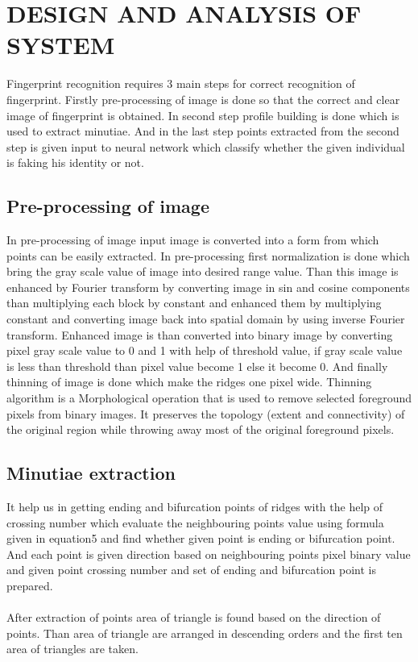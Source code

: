 \documentclass[a4paper, 12pt]{article}
\begin{document}
\section{DESIGN AND ANALYSIS OF SYSTEM}
Fingerprint recognition requires 3 main steps for correct recognition of fingerprint. Firstly pre-processing of image is done so that the correct and clear image of fingerprint is obtained. In second step profile building is done which is used to extract minutiae. And in the last step points extracted from the second step is given input to neural network which classify whether the given individual is faking his identity or not.
\subsection{Pre-processing of image}
In pre-processing of image input image is converted into a form from which points can be easily extracted. In pre-processing first normalization is done which bring the gray scale value of image into desired range value. Than this image is enhanced by Fourier transform by converting image in sin and cosine components than multiplying each block by constant and enhanced them by multiplying constant and converting image back into spatial domain by using inverse Fourier transform. Enhanced image is than converted into binary image by converting pixel gray scale value to 0 and 1 with help of threshold value, if gray scale value is less than threshold than pixel value become 1 else it become 0. And finally thinning of image is done which make the ridges one pixel wide. Thinning algorithm is a Morphological operation that is used to remove selected foreground pixels from binary images. It preserves the topology (extent and connectivity) of the original region while throwing away most of the original foreground pixels.
\subsection{Minutiae extraction}
It help us in getting ending and bifurcation points of ridges with the help of crossing number which evaluate the neighbouring points value using formula given in equation5 and find whether given point is ending or bifurcation point. And each point is given direction based on neighbouring points pixel binary value and given point crossing number and set of ending and bifurcation point is prepared.\\\\
After extraction of points area of triangle is found based on the direction of points. Than area of triangle are arranged in descending orders and the first ten area of triangles are taken. 
\end{document}
